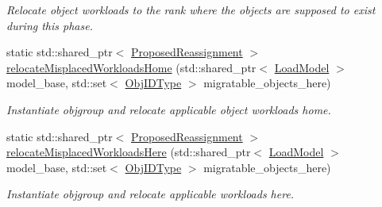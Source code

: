 \begin{DoxyCompactItemize}
\begin{DoxyCompactList}\small\item\em Relocate object workloads to the rank where the objects are supposed to exist during this phase. \end{DoxyCompactList}\item 
static std\+::shared\+\_\+ptr$<$ \hyperlink{structvt_1_1vrt_1_1collection_1_1balance_1_1_proposed_reassignment}{Proposed\+Reassignment} $>$ \hyperlink{structvt_1_1vrt_1_1collection_1_1balance_1_1replay_1_1_workload_data_migrator_ab2b10870f360900ee4f3a8c7bcadf35e}{relocate\+Misplaced\+Workloads\+Home} (std\+::shared\+\_\+ptr$<$ \hyperlink{structvt_1_1vrt_1_1collection_1_1balance_1_1_load_model}{Load\+Model} $>$ model\+\_\+base, std\+::set$<$ \hyperlink{structvt_1_1vrt_1_1collection_1_1lb_1_1_base_l_b_a790b22acf448880599724749cdc4e9b3}{Obj\+I\+D\+Type} $>$ migratable\+\_\+objects\+\_\+here)
\begin{DoxyCompactList}\small\item\em Instantiate objgroup and relocate applicable object workloads home. \end{DoxyCompactList}\item 
static std\+::shared\+\_\+ptr$<$ \hyperlink{structvt_1_1vrt_1_1collection_1_1balance_1_1_proposed_reassignment}{Proposed\+Reassignment} $>$ \hyperlink{structvt_1_1vrt_1_1collection_1_1balance_1_1replay_1_1_workload_data_migrator_a6d6d6faa7e20efd65e1fd2deb3100e14}{relocate\+Misplaced\+Workloads\+Here} (std\+::shared\+\_\+ptr$<$ \hyperlink{structvt_1_1vrt_1_1collection_1_1balance_1_1_load_model}{Load\+Model} $>$ model\+\_\+base, std\+::set$<$ \hyperlink{structvt_1_1vrt_1_1collection_1_1lb_1_1_base_l_b_a790b22acf448880599724749cdc4e9b3}{Obj\+I\+D\+Type} $>$ migratable\+\_\+objects\+\_\+here)
\begin{DoxyCompactList}\small\item\em Instantiate objgroup and relocate applicable workloads here. \end{DoxyCompactList}\end{DoxyCompactItemize}
